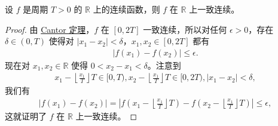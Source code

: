 \documentclass[../../main.tex]{subfiles}
\begin{document}
\begin{proposition}[连续周期函数必一致连续]\label{proposition:连续周期函数必一致连续}
设 \(f\) 是周期 \(T > 0\) 的 \(\mathbb{R}\) 上的连续函数，则 \(f\) 在 \(\mathbb{R}\) 上一致连续。
\end{proposition}
\begin{proof}
由 \hyperref[theorem:Cantor定理]{Cantor 定理}，\(f\) 在 \([0, 2T]\) 一致连续，所以对任何 \(\epsilon > 0\)，存在 \(\delta \in (0, T)\) 使得对 \(|x_1 - x_2| < \delta\)，\(x_1, x_2 \in [0, 2T]\) 都有
\begin{align*}
|f(x_1) - f(x_2)| \leqslant \epsilon.
\end{align*}
现在对 \(x_1, x_2 \in \mathbb{R}\) 使得 \(0 < x_2 - x_1 < \delta\)。注意到
\begin{align*}
x_1 - \left\lfloor \frac{x_1}{T} \right\rfloor T \in [0, T), x_2 - \left\lfloor \frac{x_1}{T} \right\rfloor T \in [0, 2T), |x_1 - x_2| < \delta,
\end{align*}
我们有
\begin{align*}
|f(x_1) - f(x_2)| = \left| f\left( x_1 - \left\lfloor \frac{x_1}{T} \right\rfloor T \right) - f\left( x_2 - \left\lfloor \frac{x_1}{T} \right\rfloor T \right) \right| \leqslant \epsilon,
\end{align*}
这就证明了 \(f\) 在 \(\mathbb{R}\) 上一致连续。 
\end{proof}
\end{document}
